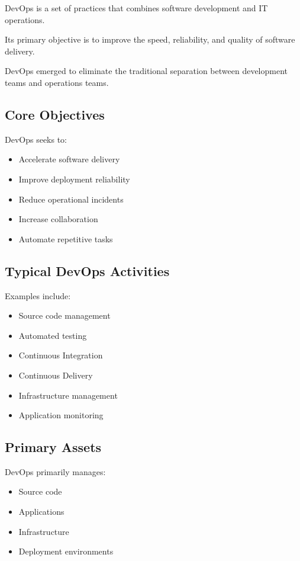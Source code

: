 DevOps is a set of practices that combines software development and IT operations.

Its primary objective is to improve the speed, reliability, and quality of software delivery.

DevOps emerged to eliminate the traditional separation between development teams and operations teams.

\subsection{Core Objectives}

DevOps seeks to:

\begin{itemize}
    \item Accelerate software delivery
    \item Improve deployment reliability
    \item Reduce operational incidents
    \item Increase collaboration
    \item Automate repetitive tasks
\end{itemize}

\subsection{Typical DevOps Activities}

Examples include:

\begin{itemize}
    \item Source code management
    \item Automated testing
    \item Continuous Integration
    \item Continuous Delivery
    \item Infrastructure management
    \item Application monitoring
\end{itemize}

\subsection{Primary Assets}

DevOps primarily manages:

\begin{itemize}
    \item Source code
    \item Applications
    \item Infrastructure
    \item Deployment environments
\end{itemize}

